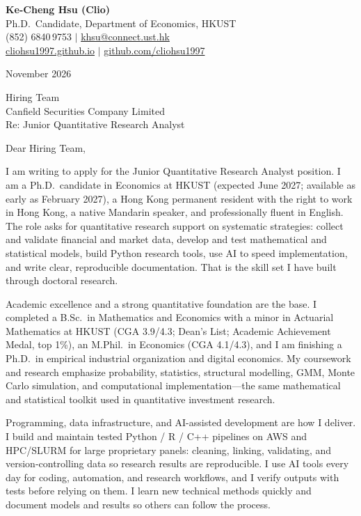 \documentclass[11pt,letterpaper]{article}
\begin{document}
\noindent
{\bfseries Ke-Cheng Hsu (Clio)}\\
Ph.D.\ Candidate, Department of Economics, HKUST\\
(852) 6840\,9753 \quad $|$ \quad \href{mailto:khsu@connect.ust.hk}{khsu@connect.ust.hk}\\
\href{https://cliohsu1997.github.io/}{cliohsu1997.github.io} \quad $|$ \quad \href{https://github.com/cliohsu1997}{github.com/cliohsu1997}

\vspace{0.4em}
 November 2026

\vspace{0.3em}
\noindent
Hiring Team\\
Canfield Securities Company Limited\\
Re: Junior Quantitative Research Analyst

\vspace{0.15em}
Dear Hiring Team,

I am writing to apply for the Junior Quantitative Research Analyst position. I am a Ph.D.\ candidate in Economics at HKUST (expected June 2027; available as early as February 2027), a Hong Kong permanent resident with the right to work in Hong Kong, a native Mandarin speaker, and professionally fluent in English. The role asks for quantitative research support on systematic strategies: collect and validate financial and market data, develop and test mathematical and statistical models, build Python research tools, use AI to speed implementation, and write clear, reproducible documentation. That is the skill set I have built through doctoral research.

Academic excellence and a strong quantitative foundation are the base. I completed a B.Sc.\ in Mathematics and Economics with a minor in Actuarial Mathematics at HKUST (CGA 3.9/4.3; Dean's List; Academic Achievement Medal, top 1\%), an M.Phil.\ in Economics (CGA 4.1/4.3), and I am finishing a Ph.D.\ in empirical industrial organization and digital economics. My coursework and research emphasize probability, statistics, structural modelling, GMM, Monte Carlo simulation, and computational implementation---the same mathematical and statistical toolkit used in quantitative investment research.

Programming, data infrastructure, and AI-assisted development are how I deliver. I build and maintain tested Python / R / C++ pipelines on AWS and HPC/SLURM for large proprietary panels: cleaning, linking, validating, and version-controlling data so research results are reproducible. I use AI tools every day for coding, automation, and research workflows, and I verify outputs with tests before relying on them. I learn new technical methods quickly and document models and results so others can follow the process.
\end{document}
